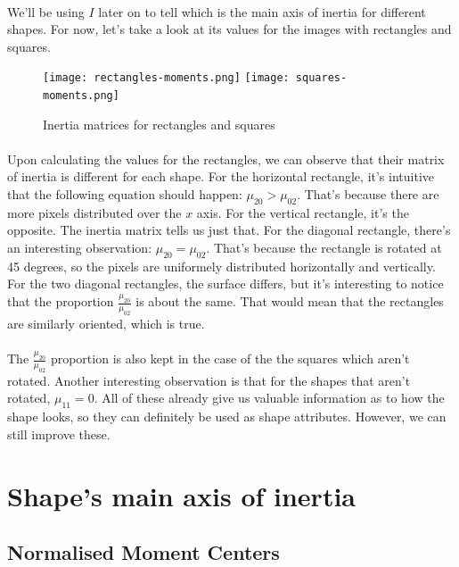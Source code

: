 \clearpage
\paragraph{}
We'll be using $I$ later on to tell which is the main axis of inertia for different shapes.
For now, let's take a look at its values for the images with rectangles and squares.
\begin{figure}[H]
    \centering
    \texttt{[image: rectangles-moments.png]}
    \texttt{[image: squares-moments.png]}
    \caption{Inertia matrices for rectangles and squares}
\end{figure}
\paragraph{}
Upon calculating the values for the rectangles, we can observe that their matrix of inertia is different for each shape.
For the horizontal rectangle, it's intuitive that the following equation should happen: $\mu_{20} > \mu_{02}$.
That's because there are more pixels distributed over the $x$ axis. For the vertical rectangle, it's the opposite.
The inertia matrix tells us just that.
For the diagonal rectangle, there's an interesting observation: $\mu_{20} = \mu_{02}$. That's because the rectangle is rotated at 45 degrees, so the pixels are uniformely distributed horizontally and vertically.
For the two diagonal rectangles, the surface differs, but it's interesting to notice that the proportion $\frac{\mu_{20}}{\mu_{02}}$ is about the same. That would mean that the rectangles are similarly oriented, which is true.
\paragraph{}
The $\frac{\mu_{20}}{\mu_{02}}$ proportion is also kept in the case of the the squares which aren't rotated.
Another interesting observation is that for the shapes that aren't rotated, $\mu_{11} = 0$.
All of these already give us valuable information as to how the shape looks, so they can definitely be used as shape attributes.
However, we can still improve these.

\section{Shape's main axis of inertia}
\subsection{Normalised Moment Centers}
